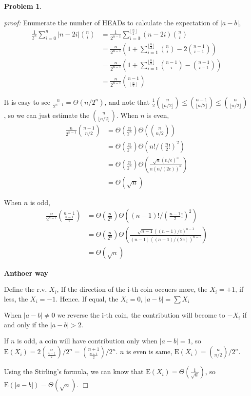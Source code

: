 \documentclass{article}
\newtheorem{problem}[theorem]{Problem}
\newenvironment{solution}{\noindent \textit{proof:}}{$\Box$}
\begin{document}
\begin{problem}
\end{problem}
\begin{solution}
    Enumerate the number of HEADs to calculate the expectation of $|a-b|$,
    \begin{align*}
        \frac 1 {2^n}\sum_{i=0}^n|n-2i|\binom{n}{i}
        &=\frac 1 {2^{n-1}}\sum_{i=0}^{\lfloor\frac n 2\rfloor}(n-2i)\binom{n}{i} \\
        &=\frac n {2^{n-1}}(1+\sum_{i=1}^{\lfloor\frac n 2\rfloor}\binom{n}{i} - 2\binom{n-1}{i-1})\\
        &=\frac n {2^{n-1}}(1+\sum_{i=1}^{\lfloor\frac n 2\rfloor}\binom{n-1}{i} - \binom{n-1}{i-1})\\
        &=\frac n {2^{n-1}}\binom{n-1}{\lfloor\frac n 2\rfloor}
  \end{align*}  
  
  It is easy to see $\frac n {2^{n-1}} = \Theta(n / 2^n)$, and note that $\frac 1 2 \binom{n}{\lfloor n / 2 \rfloor} \leq \binom{n-1}{\lfloor n / 2 \rfloor} \leq \binom{n}{\lfloor n / 2 \rfloor}$, so we can 
  just estimate the $\binom{n}{\lfloor n / 2 \rfloor}$. When $n$ is even,
  \begin{align*}
    \frac n {2^{n-1}}\binom{n-1}{n/2} 
    &= \Theta \left(\frac{n}{2^n}\right) \Theta \left( \binom{n}{n/2} \right) \\
    &= \Theta \left(\frac{n}{2^n}\right) \Theta \left(n!/(\frac {n}{2}!)^2\right) \\
    &= \Theta \left(\frac{n}{2^n}\right) \Theta \left(\frac {\sqrt{n}(n/e)^n} {n (n/(2e))^n}\right) \\
    &= \Theta (\sqrt{n})
  \end{align*}
  
  When $n$ is odd,
  \begin{align*}
    \frac n {2^{n-1}}\binom{n-1}{\frac {n-1} 2} 
    &= \Theta \left(\frac{n}{2^n}\right) \Theta \left((n-1)!/(\frac {n-1}{2}!)^2\right) \\
    &= \Theta \left(\frac{n}{2^n}\right) \Theta \left(\frac {\sqrt{n-1}((n-1)/e)^{n-1}} {(n-1) ((n-1)/(2e))^{n-1}}\right) \\
    &= \Theta (\sqrt{n})
  \end{align*}
  
  \textbf{Anthoer way}
  
  Define the r.v. $X_i$, If the direction of the i-th coin occuers more, the $X_i = +1$, if less, the $X_i = -1$. Hence. If equal, the $X_i = 0$, $|a-b|=\sum X_i$
  
  When $|a-b|\not=0$ we reverse the i-th coin, the contribution will  become to $-X_i$
  if and only if the $|a-b| > 2$. 
  
  If $n$ is odd, a coin will have contribution only when $|a-b|=1$, 
  so $\mathrm{E}(X_i)=2\binom{n}{\frac {n-1}2}/2^{n}=\binom{n+1}{\frac {n+1} 2} / 2^n$.
  $n$ is even is same, $\mathrm{E}(X_i)= \binom{n}{n/2}/2^n$.
  
  Using the Stirling's formula, we can know that $\mathrm{E}(X_i)=\Theta(\frac 1 {\sqrt{n}})$, so 
  $\mathrm{E}(|a-b|)=\Theta(\sqrt{n})$.
\end{solution}
\end{document}
